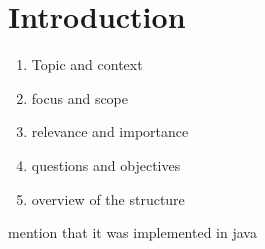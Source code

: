 
\chapter{Introduction}

\begin{enumerate}
    \item
    Topic and context\\
    
    
    \item
    focus and scope
    
    \item
    relevance and importance
    
    \item
    questions and objectives
    
    \item
    overview of the structure
\end{enumerate}


mention that it was implemented in java